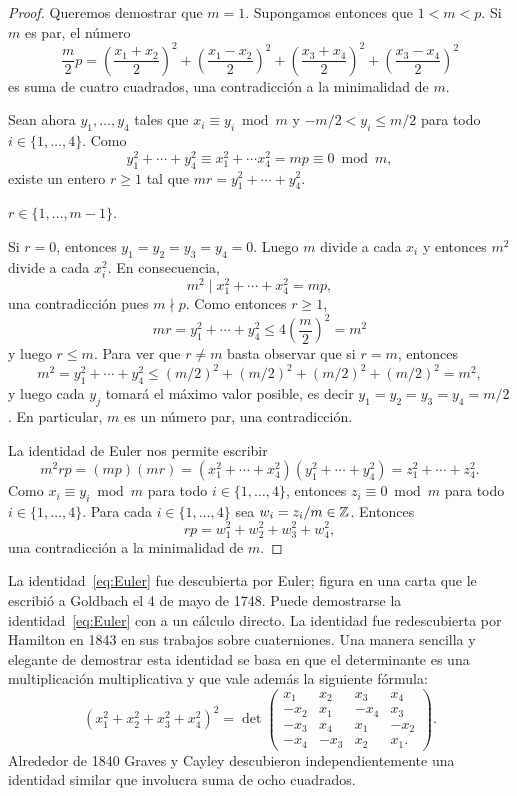 \begin{proof}
	Queremos demostrar que $m=1$. Supongamos
	entonces que $1<m<p$. Si $m$ es par, el número 
	\[
		\frac{m}{2}p=\left(\frac{x_1+x_2}{2}\right)^2
		+\left(\frac{x_1-x_2}{2}\right)^2
		+\left(\frac{x_3+x_4}{2}\right)^2
		+\left(\frac{x_3-x_4}{2}\right)^2
	\]
	es suma de cuatro cuadrados, una contradicción a la minimalidad de $m$. 
	
	Sean ahora $y_1,\dots,y_4$ tales que $x_i\equiv y_i\bmod m$
	y $-m/2<y_i\leq m/2$ para todo $i\in\{1,\dots,4\}$. Como
	\[
		y_1^2+\cdots+y_4^2\equiv x_1^2+\cdots x_4^2= mp\equiv 0\bmod m,
	\]
	existe un entero $r\geq1$ tal que $mr=y_1^2+\cdots+y_4^2$. 
	
	\begin{claim}
		$r\in\{1,\dots,m-1\}$. 
	\end{claim}

	Si $r=0$, entonces $y_1=y_2=y_3=y_4=0$. Luego $m$ divide a cada $x_i$ y
	entonces $m^2$ divide a cada $x_i^2$. En consecuencia, 
	\[
		m^2\mid x_1^2+\cdots+x_4^2=mp,
	\]
	una contradicción pues $m\nmid p$. Como entonces $r\geq 1$, 
	\[
		mr=y_1^2+\cdots+y_4^2\leq 4\left(\frac{m}{2}\right)^2=m^2
	\]
	y luego $r\leq m$. Para ver que $r\ne m$ basta observar que si $r=m$, 
	entonces 
	\[
		m^2=y_1^2+\cdots+y_4^2\leq (m/2)^2+(m/2)^2+(m/2)^2+(m/2)^2=m^2,
	\]
	y luego cada $y_j$ tomará el máximo valor posible, es decir
	$y_1=y_2=y_3=y_4=m/2$. En particular, $m$ es un número par, una contradicción. 

	\medskip
	La identidad de Euler nos permite escribir
	\[
		m^2rp=(mp)(mr)=(x_1^2+\cdots+x_4^2)(y_1^2+\cdots+y_4^2)=z_1^2+\cdots+z_4^2.
	\]
	Como $x_i\equiv y_i\bmod m$ para todo $i\in\{1,\dots,4\}$, entonces 
	$z_i\equiv 0\bmod m$ para todo $i\in\{1,\dots,4\}$. Para cada $i\in\{1,\dots,4\}$ sea
	$w_i=z_i/m\in\mathbb{Z}$. Entonces 
	\[
		rp=w_1^2+w_2^2+w_3^2+w_4^2,
	\]
	una contradicción a la minimalidad de $m$.
\end{proof}

La identidad~\eqref{eq:Euler} fue descubierta por Euler; figura en una carta
que le escribió a Goldbach el 4 de mayo de 1748. Puede demostrarse la
identidad~\eqref{eq:Euler} con a un cálculo directo. La identidad fue
redescubierta por Hamilton en 1843 en sus trabajos sobre cuaterniones. Una
manera sencilla y elegante de demostrar esta identidad se basa en que el
determinante es una multiplicación multiplicativa y que vale además la
siguiente fórmula:
\[
	(x_1^2+x_2^2+x_3^2+x_4^2)^2=\det\begin{pmatrix}
		x_1 & x_2 & x_3 & x_4\\
		-x_2 & x_1 & -x_4 & x_3\\
		-x_3 & x_4 & x_1 & -x_2\\
		-x_4 & -x_3 & x_2 & x_1.
	\end{pmatrix}.
\]
Alrededor de 1840 Graves y Cayley descubieron independientemente una identidad
similar que involucra suma de ocho cuadrados. 

